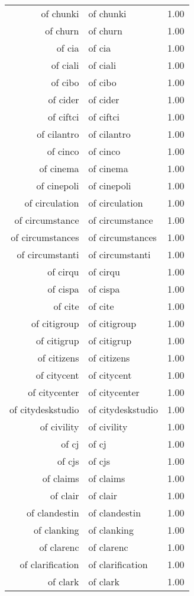 \begin{table}[ht]
\begin{tabular}{rlr}
  of chunki & of chunki & 1.00 \\ 
  of churn & of churn & 1.00 \\ 
  of cia & of cia & 1.00 \\ 
  of ciali & of ciali & 1.00 \\ 
  of cibo & of cibo & 1.00 \\ 
  of cider & of cider & 1.00 \\ 
  of ciftci & of ciftci & 1.00 \\ 
  of cilantro & of cilantro & 1.00 \\ 
  of cinco & of cinco & 1.00 \\ 
  of cinema & of cinema & 1.00 \\ 
  of cinepoli & of cinepoli & 1.00 \\ 
  of circulation & of circulation & 1.00 \\ 
  of circumstance & of circumstance & 1.00 \\ 
  of circumstances & of circumstances & 1.00 \\ 
  of circumstanti & of circumstanti & 1.00 \\ 
  of cirqu & of cirqu & 1.00 \\ 
  of cispa & of cispa & 1.00 \\ 
  of cite & of cite & 1.00 \\ 
  of citigroup & of citigroup & 1.00 \\ 
  of citigrup & of citigrup & 1.00 \\ 
  of citizens & of citizens & 1.00 \\ 
  of citycent & of citycent & 1.00 \\ 
  of citycenter & of citycenter & 1.00 \\ 
  of citydeskstudio & of citydeskstudio & 1.00 \\ 
  of civility & of civility & 1.00 \\ 
  of cj & of cj & 1.00 \\ 
  of cjs & of cjs & 1.00 \\ 
  of claims & of claims & 1.00 \\ 
  of clair & of clair & 1.00 \\ 
  of clandestin & of clandestin & 1.00 \\ 
  of clanking & of clanking & 1.00 \\ 
  of clarenc & of clarenc & 1.00 \\ 
  of clarification & of clarification & 1.00 \\ 
  of clark & of clark & 1.00 \\ 

\end{tabular}
\end{table}

